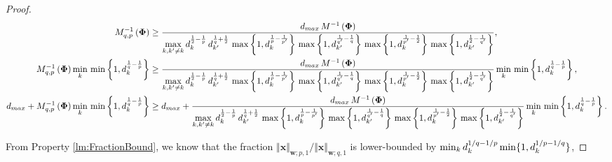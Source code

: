 \begin{proof}
\begin{gather*}
\begin{aligned}
M_{q,p}^{-1}\left( \boldsymbol{\Phi} \right) &\geq 
\frac{d_{max} \, M^{-1}\left( \boldsymbol{\Phi} \right)}{\displaystyle\max_{k,k' \neq k} d_{k}^{\frac12 - \frac1p} \, d_{k'}^{\frac1q + \frac12} \, \max \left\lbrace 1 , d_k^{\frac1p - \frac{1}{p'}} \right\rbrace \, \max \left\lbrace 1 , d_{k'}^{\frac{1}{q'} - \frac1q} \right\rbrace \, \max \left\lbrace 1 , d_k^{\frac{1}{p'} -\frac12} \right\rbrace \, \max \left\lbrace 1 , d_{k'}^{\frac{1}{2} - \frac{1}{q'}} \right\rbrace}, \\ 
M_{q,p}^{-1}\left( \boldsymbol{\Phi} \right) \displaystyle\min_{k} \, \min \left\lbrace 1 , d_k^{\frac1q - \frac1p} \right\rbrace &\geq 
\frac{d_{max} \, M^{-1}\left( \boldsymbol{\Phi} \right)}{\displaystyle\max_{k,k' \neq k} d_{k}^{\frac12 - \frac1p} \, d_{k'}^{\frac1q + \frac12} \, \max \left\lbrace 1 , d_k^{\frac1p - \frac{1}{p'}} \right\rbrace \, \max \left\lbrace 1 , d_{k'}^{\frac{1}{q'} - \frac1q} \right\rbrace \, \max \left\lbrace 1 , d_k^{\frac{1}{p'} -\frac12} \right\rbrace \, \max \left\lbrace 1 , d_{k'}^{\frac{1}{2} - \frac{1}{q'}} \right\rbrace} \displaystyle\min_{k} \, \min \left\lbrace 1 , d_k^{\frac1q - \frac1p} \right\rbrace, \\ 
d_{max} + M_{q,p}^{-1}\left( \boldsymbol{\Phi} \right) \displaystyle\min_{k} \, \min \left\lbrace 1 , d_k^{\frac1q - \frac1p} \right\rbrace &\geq 
d_{max} + \frac{d_{max} \, M^{-1}\left( \boldsymbol{\Phi} \right)}{\displaystyle\max_{k,k' \neq k} d_{k}^{\frac12 - \frac1p} \, d_{k'}^{\frac1q + \frac12} \, \max \left\lbrace 1 , d_k^{\frac1p - \frac{1}{p'}} \right\rbrace \, \max \left\lbrace 1 , d_{k'}^{\frac{1}{q'} - \frac1q} \right\rbrace \, \max \left\lbrace 1 , d_k^{\frac{1}{p'} -\frac12} \right\rbrace \, \max \left\lbrace 1 , d_{k'}^{\frac{1}{2} - \frac{1}{q'}} \right\rbrace} \displaystyle\min_{k} \, \min \left\lbrace 1 , d_k^{\frac1q - \frac1p} \right\rbrace.
\end{aligned}
\end{gather*}

\iffalse
From Property \ref{lm:FractionBound}, we know that the fraction $\Vert \boldsymbol{x} \Vert_{\boldsymbol{w};p,1}/ \Vert\boldsymbol{x} \Vert_{\boldsymbol{w};q,1}$ is lower-bounded by $\min_k d_k^{1/q {-} 1/p} \min \{1 , d_k^{1/p {-} 1/q} \}$, 


\end{proof}
